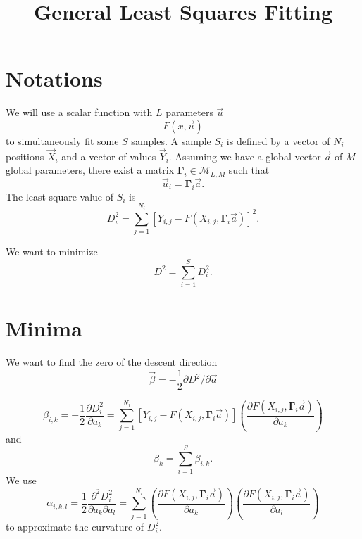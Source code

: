 \documentclass[aps,twocolumn]{revtex4}
\newcommand{\mymat}[1]{\boldsymbol{#1}}
\begin{document}
\title{General Least Squares Fitting}
\maketitle

\section{Notations}
We will use a scalar function with $L$ parameters $\vec{u}$
\begin{equation}
	F(x,\vec{u})
\end{equation}
to simultaneously fit some $S$ samples.
A sample $S_i$ is defined by a vector of $N_i$ positions $\vec{X}_i$ and
a vector of values $\vec{Y}_i$.
Assuming we have a global vector $\vec{a}$ of $M$ global parameters, there exist a
matrix $\mymat{\Gamma}_i\in\mathcal{M}_{L,M}$
such that
\begin{equation}
	\vec{u}_i = \mymat{\Gamma}_i \vec{a}.
\end{equation}
The least square value of $S_i$ is
\begin{equation}
	D^2_i = \sum_{j=1}^{N_i} \left[ Y_{i,j} - F\left(X_{i,j},\mymat{\Gamma}_i \vec{a}\right)\right]^2.
\end{equation}

We want to minimize 
\begin{equation}
	D^2 = \sum_{i=1}^{S} D^2_i.
\end{equation}

\section{Minima}
We want to find the zero of the descent direction
$$\vec{\beta}=-\dfrac{1}{2}\partial D^2 / \partial \vec{a}$$

\begin{equation}
	\beta_{i,k} = -\dfrac{1}{2}\dfrac{\partial D_i^2}{\partial a_k} 
	= \sum_{j=1}^{N_i} \left[
	Y_{i,j} - F\left(X_{i,j},\mymat{\Gamma}_i \vec{a}\right)
	\right] 
	\left(\dfrac{\partial F(X_{i,j},\mymat{\Gamma}_i \vec{a})}{\partial a_k}\right)
\end{equation}
and
\begin{equation}
	\beta_k = \sum_{i=1}^{S} \beta_{i,k}.
\end{equation}
We use
\begin{equation}
	\alpha_{i,k,l} = \dfrac{1}{2} \dfrac{\partial^2 D_i^2}{\partial a_k\partial a_l} =
	\sum_{j=1}^{N_i} 
	 \left(\dfrac{\partial F(X_{i,j},\mymat{\Gamma}_i \vec{a})}{\partial a_k}\right) \left(\dfrac{\partial F(X_{i,j},\mymat{\Gamma}_i \vec{a})}{\partial a_l}\right) 
\end{equation}
to approximate the curvature of $D_i^2$.
\end{document}
